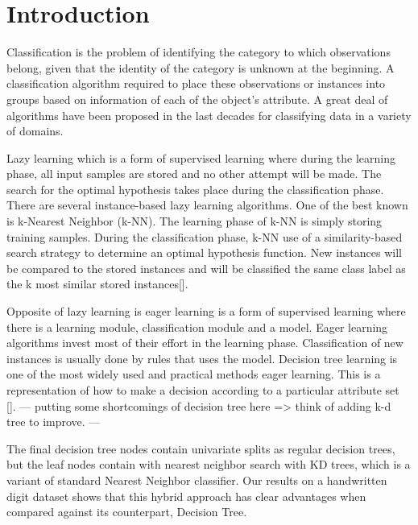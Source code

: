 \section{Introduction}
Classification is the problem of identifying the category to which observations belong, given that the identity of the category is unknown at the beginning. A classification algorithm required to place these observations or instances into groups based on information of each of the object’s attribute. A great deal of algorithms have been proposed in the last decades for classifying data in a variety of domains.

  Lazy learning which is a form of supervised learning where during the learning phase, all input samples are stored and no other attempt will be made. The search for the optimal hypothesis takes place during the classification phase. There are several instance-based lazy learning algorithms. One of the best known is k-Nearest Neighbor (k-NN). The learning phase of k-NN is simply storing training samples. During the classification phase, k-NN use of a similarity-based search strategy to determine an optimal hypothesis function. New instances will be compared to the stored instances and will be classified the same class label as the k most similar stored instances[\cite{FathiMazinani}].

  Opposite of lazy learning is eager learning is a form of supervised learning where there is a learning module, classification module and a model. Eager learning algorithms invest most of their effort in the learning phase. Classification of new instances is usually done by rules that uses the model. Decision tree learning is one of the most widely used and practical methods eager learning. This is a representation of how to make a decision according to a particular attribute set [\cite{FathiMazinani}]. --- putting some shortcomings of decision tree here => think of adding k-d tree to improve. ---

  The final decision tree nodes contain univariate splits as regular decision trees, but the leaf nodes contain with nearest neighbor search with KD trees, which is a variant of standard Nearest Neighbor classifier. Our results on a handwritten digit dataset shows that this hybrid approach has clear advantages when compared against its counterpart, Decision Tree.
